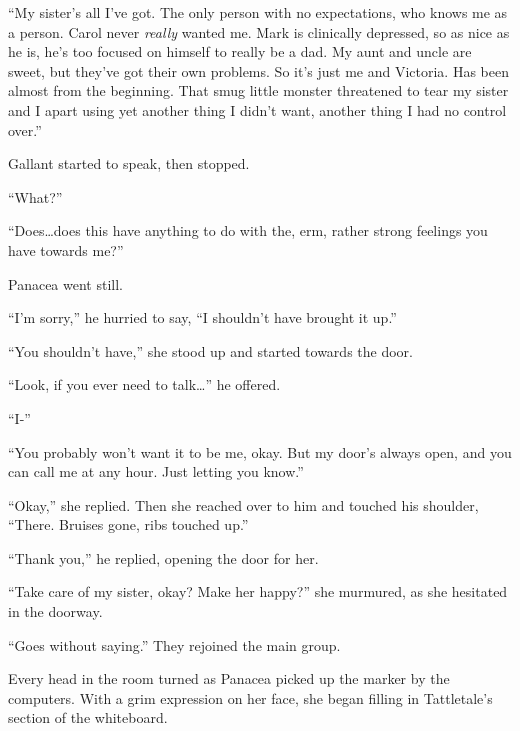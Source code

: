 ``My sister's all I've got.  The only person with no expectations, who knows me as a person.  Carol never \emph{really} wanted me.  Mark is clinically depressed, so as nice as he is, he's too focused on himself to really be a dad.  My aunt and uncle are sweet, but they've got their own problems.  So it's just me and Victoria.  Has been almost from the beginning.  That smug little monster threatened to tear my sister and I apart using yet another thing I didn't want, another thing I had no control over.''



Gallant started to speak, then stopped.



``What?''



``Does\ldots does this have anything to do with the, erm, rather strong feelings you have towards me?''



Panacea went still.



``I'm sorry,'' he hurried to say, ``I shouldn't have brought it up.''



``You shouldn't have,'' she stood up and started towards the door.



``Look, if you ever need to talk\ldots'' he offered.



``I-''



``You probably won't want it to be me, okay.  But my door's always open, and you can call me at any hour.  Just letting you know.''



``Okay,'' she replied.  Then she reached over to him and touched his shoulder, ``There.  Bruises gone, ribs touched up.''



``Thank you,'' he replied, opening the door for her.



``Take care of my sister, okay?  Make her happy?'' she murmured, as she hesitated in the doorway.



``Goes without saying.'' They rejoined the main group.



Every head in the room turned as Panacea picked up the marker by the computers.  With a grim expression on her face, she began filling in Tattletale's section of the whiteboard.





